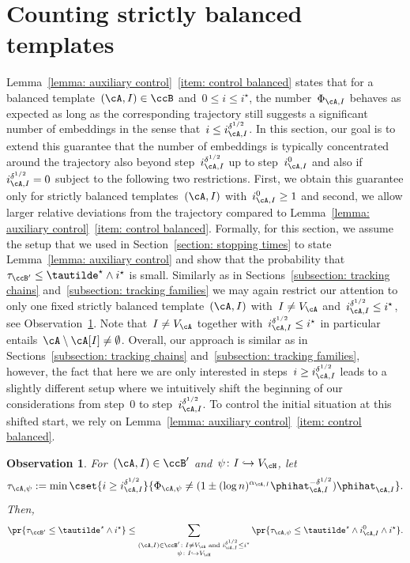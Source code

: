 \documentclass[11pt]{amsart}
\newcommand{\stand}{\text{ and }}
\newcommand{\injection}{\hookrightarrow}
\newtheorem{observation}[algocf]{Observation}
\theoremstyle{definition}
\numberwithin{equation}{section}
\begin{document}
	\section{Counting strictly balanced templates}\label{appendix: strictly balanced}
	Lemma~\ref{lemma: auxiliary control}~\ref{item: control balanced} states that for a balanced template~$(\cA,I)\in\ccB$ and~$0\leq i\leq i^\star$, the number~$\Phi_{\cA,I}$ behaves as expected as long as the corresponding trajectory still suggests a significant number of embeddings in the sense that~$i\leq i_{\cA,I}^{\delta^{1/2}}$.
	In this section, our goal is to extend this guarantee that the number of embeddings is typically concentrated around the trajectory also beyond step~$i_{\cA,I}^{\delta^{1/2}}$ up to step~$i_{\cA,I}^0$ and also if~$i_{\cA,I}^{\delta^{1/2}}=0$ subject to the following two restrictions.
	First, we obtain this guarantee only for strictly balanced templates~$(\cA,I)$ with~$i_{\cA,I}^{0}\geq 1$ and second, we allow larger relative deviations from the trajectory compared to Lemma~\ref{lemma: auxiliary control}~\ref{item: control balanced}.
	Formally, for this section, we assume the setup that we used in Section~\ref{section: stopping times} to state Lemma~\ref{lemma: auxiliary control} and show that the probability that~$\tau_{\ccB'}\leq \tautilde^\star\wedge i^\star$ is small.
	Similarly as in Sections~\ref{subsection: tracking chains} and~\ref{subsection: tracking families} we may again restrict our attention to only one fixed strictly balanced template~$(\cA,I)$ with~$I\neq V_\cA$ and~$i_{\cA,I}^{\delta^{1/2}}\leq i^\star$, see Observation~\ref{observation: strictly balanced individual}.
	Note that~$I\neq V_\cA$ together with~$i_{\cA,I}^{\delta^{1/2}}\leq i^\star$ in particular entails~$\cA\setminus\cA[I]\neq\emptyset$.
	Overall, our approach is similar as in Sections~\ref{subsection: tracking chains} and~\ref{subsection: tracking families}, however, the fact that here we are only interested in steps~$i\geq i_{\cA,I}^{\delta^{1/2}}$ leads to a slightly different setup where we intuitively shift the beginning of our considerations from step~$0$ to step~$i_{\cA,I}^{\delta^{1/2}}$.
	To control the initial situation at this shifted start, we rely on Lemma~\ref{lemma: auxiliary control}~\ref{item: control balanced}.
	
	\begin{observation}\label{observation: strictly balanced individual}
		For~$(\cA,I)\in\ccB'$ and~$\psi\colon I\injection V_\cH$, let
		\begin{equation*}
			\tau_{\cA,\psi}:=\min\cset{ i\geq i^{\delta^{1/2}}_{\cA,I} }{ \Phi_{\cA,\psi}\neq (1\pm (\log n)^{\alpha_{\cA,I}}\phihat_{\cA,I}^{-\delta^{1/2}})\phihat_{\cA,I} }.
		\end{equation*}
		Then,
		\begin{equation*}
			\pr{\tau_{\ccB'}\leq \tautilde^\star\wedge i^\star}\leq  \sum_{\substack{(\cA,I)\in\ccB'\colon I\neq V_\cA\stand i_{\cA,I}^{\delta^{1/2}}\leq i^\star\\ \psi\colon I\injection V_\cH}} \pr{\tau_{\cA,\psi}\leq \tautilde^\star\wedge i^0_{\cA,I}\wedge i^\star}.
		\end{equation*}
	\end{observation}
	
\end{document}
